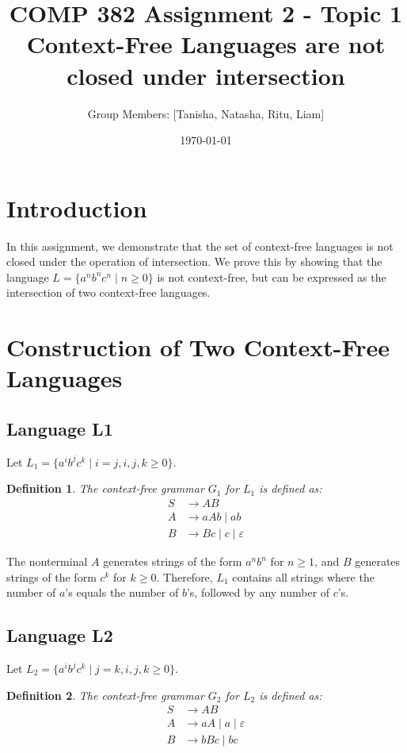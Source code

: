 \documentclass[12pt]{article}
\title{COMP 382 Assignment 2 - Topic 1\\
Context-Free Languages are not closed under intersection}
\author{Group Members: [Tanisha, Natasha, Ritu, Liam]}
\date{\today}
\newtheorem{definition}{Definition}
\begin{document}
\maketitle

\section{Introduction}

In this assignment, we demonstrate that the set of context-free languages is not closed under the operation of intersection. We prove this by showing that the language $L = \{a^n b^n c^n \mid n \geq 0\}$ is not context-free, but can be expressed as the intersection of two context-free languages.

\section{Construction of Two Context-Free Languages}

\subsection{Language L1}

Let $L_1 = \{a^i b^j c^k \mid i = j, i,j,k \geq 0\}$.

\begin{definition}
The context-free grammar $G_1$ for $L_1$ is defined as:
\begin{align}
S &\to AB \\
A &\to aAb \mid ab \\
B &\to Bc \mid c \mid \varepsilon
\end{align}
\end{definition}

The nonterminal $A$ generates strings of the form $a^n b^n$ for $n \geq 1$, and $B$ generates strings of the form $c^k$ for $k \geq 0$. Therefore, $L_1$ contains all strings where the number of $a$'s equals the number of $b$'s, followed by any number of $c$'s.

\subsection{Language L2}

Let $L_2 = \{a^i b^j c^k \mid j = k, i,j,k \geq 0\}$.

\begin{definition}
The context-free grammar $G_2$ for $L_2$ is defined as:
\begin{align}
S &\to AB \\
A &\to aA \mid a \mid \varepsilon \\
B &\to bBc \mid bc
\end{align}
\end{definition}
\end{document}
